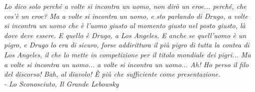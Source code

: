 \thispagestyle{empty}
\begin{flushright}
    \vspace*{0.5\textheight}
    \emph{Lo dico solo perché a volte si incontra un uomo, non dirò un eroe... perché, che cos'è un eroe? Ma a volte si incontra un uomo, e sto parlando di Drugo, a volte si incontra un uomo che è l'uomo giusto al momento giusto nel posto giusto, là dove deve essere. E quello è Drugo, a Los Angeles. E anche se quell'uomo è un pigro, e Drugo lo era di sicuro, forse addirittura il più pigro di tutta la contea di Los Angeles, il che lo mette in competizione per il titolo mondiale dei pigri... Ma a volte si incontra un uomo... a volte si incontra un uomo... Ah! Ho perso il filo del discorso! Bah, al diavolo! È più che sufficiente come presentazione.\\
    - Lo Sconosciuto, Il Grande Lebowsky}
\end{flushright}
